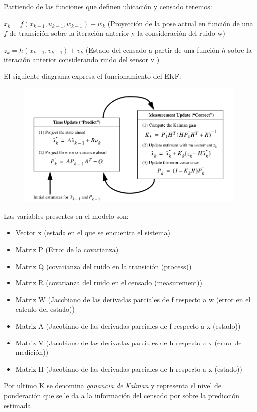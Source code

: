 Partiendo de las funciones que definen ubicación y censado tenemos:

$x_k = f(x_{k-1}, u_{k-1},w_{k-1}) + w_k$  (Proyección de la pose actual en función de una $f$ de transición sobre la iteración anterior y la consideración del ruido w)

$z_k = h(x_{k-1},v_{k-1}) + v_k$   (Estado del censado a partir de una función $h$ sobre la iteración anterior considerando ruido del sensor v )

El siguiente diagrama expresa el funcionamiento del EKF:


\begin{center}
\begin{figure}[!htb]
\includegraphics[width=\linewidth]{KalmanEsquema.png}
\end{figure}
\FloatBarrier
\end{center}

Las variables presentes en el modelo son: 

\begin{itemize}
\item Vector x (estado en el que se encuentra el sistema)
\item Matriz P (Error de la covarianza)
\item Matriz Q (covarianza del ruido en la transición (process))
\item Matriz R (covarianza del ruido en el censado (measurement))
\item Matriz W (Jacobiano de las derivadas parciales de f respecto a w (error en el calculo del estado))
\item Matriz A (Jacobiano de las derivadas parciales de f respecto a x (estado))
\item Matriz V (Jacobiano de las derivadas parciales de h respecto a v (error de medición))
\item Matriz H (Jacobiano de las derivadas parciales de h respecto a x (estado))
\end{itemize}
Por ultimo K se denomina \textit{ganancia de Kalman} y representa el nivel de ponderación que se le da a la información del censado por sobre la predicción estimada.

